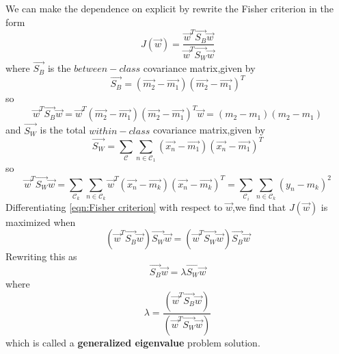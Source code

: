 We can make the dependence on  explicit by rewrite the Fisher criterion in the form
\begin{equation}\label{eqn:Fisher criterion}
J(\vec{w}) = \dfrac{\vec{w}^T\vec{S_B}\vec{w}}{\vec{w}^T\vec{S_W}\vec{w}}
\end{equation}
where $\vec{S_B}$ is the $between-class$ covariance matrix,given by 
\begin{equation}\label{eqn:Fisher between-class covariance matrix}
\vec{S_B} = (\vec{m_2}-\vec{m_1})(\vec{m_2}-\vec{m_1})^T
\end{equation}
so
\begin{equation}
\vec{w}^T\vec{S_B}\vec{w} = \vec{w} ^T(\vec{m_2} - \vec{m_1})(\vec{m_2}-\vec{m_1})^T\vec{w} = (m_2-m_1)(m_2-m_1)
\end{equation}
and $\vec{S_W}$ is the total $within-class$ covariance matrix,given by
\begin{equation}
\vec{S_W} = \sum_{\mathcal{C}}\sum_{n\in \mathcal{C}_1}(\vec{x_n} - \vec{m_1})(\vec{x_n}-\vec{m_1})^T
\end{equation}
so
\begin{equation}
\vec{w}^T\vec{S_W}\vec{w} = \sum_{\mathcal{C}_k}\sum_{n\in \mathcal{C}_k}{\vec{w}^T(\vec{x_n}-\vec{m_k})(\vec{x_n}-\vec{m_k})^T} = \sum_{\mathcal{C}_i}\sum_{n \in \mathcal{C}_k}(y_n-m_k)^2
\end{equation}
Differentiating \ref{eqn:Fisher criterion} with respect to $\vec{w}$,we find that $J(\vec{w})$ is maximized when
\begin{equation}
{(\vec{w}^T\vec{S_B}\vec{w})\vec{S_W}\vec{w}} = (\vec{w}^T\vec{S_W}\vec{w})\vec{S_B}\vec{w}
\end{equation}
Rewriting this as
\begin{equation}\label{eqn:Fisher generalized eigenvalue}
\vec{S_B}\vec{w} = \lambda\vec{S_W}\vec{w}
\end{equation}
where
\begin{equation}
\lambda = \dfrac{(\vec{w}^T\vec{S_B}\vec{w})}{(\vec{w}^T\vec{S_W}\vec{w})}
\end{equation}
which is called a \textbf{generalized eigenvalue} problem solution.

